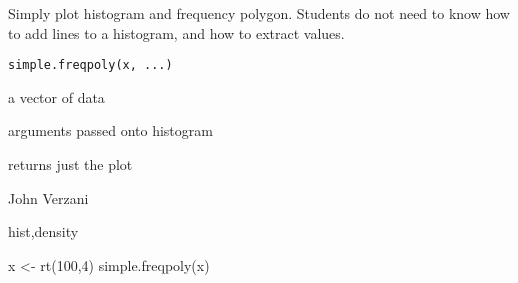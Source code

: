 \begin{Description}\relax
Simply plot histogram and frequency polygon. Students do  not need to
know how to add lines to a histogram, and how to extract values.
\end{Description}
\begin{Usage}
\begin{verbatim}
simple.freqpoly(x, ...)
\end{verbatim}
\end{Usage}
\begin{Arguments}
\begin{ldescription}
\item[\code{x}] a vector of data 
\item[\code{...}] arguments passed onto histogram 
\end{ldescription}
\end{Arguments}
\begin{Value}
returns just the plot
\end{Value}
\begin{Author}\relax
John Verzani
\end{Author}
\begin{SeeAlso}\relax
hist,density
\end{SeeAlso}
\begin{Examples}
\begin{ExampleCode}
x <- rt(100,4)
simple.freqpoly(x)
\end{ExampleCode}
\end{Examples}

